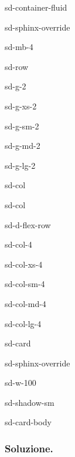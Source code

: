 \documentclass[letterpaper,10pt,italian]{jupyterBook}
\begin{document}
\begin{sphinxuseclass}{sd-container-fluid}
\begin{sphinxuseclass}{sd-sphinx-override}
\begin{sphinxuseclass}{sd-mb-4}
\begin{sphinxuseclass}{sd-row}
\begin{sphinxuseclass}{sd-g-2}
\begin{sphinxuseclass}{sd-g-xs-2}
\begin{sphinxuseclass}{sd-g-sm-2}
\begin{sphinxuseclass}{sd-g-md-2}
\begin{sphinxuseclass}{sd-g-lg-2}
\begin{sphinxuseclass}{sd-col}
\end{sphinxuseclass}
\begin{sphinxuseclass}{sd-col}
\begin{sphinxuseclass}{sd-d-flex-row}
\begin{sphinxuseclass}{sd-col-4}
\begin{sphinxuseclass}{sd-col-xs-4}
\begin{sphinxuseclass}{sd-col-sm-4}
\begin{sphinxuseclass}{sd-col-md-4}
\begin{sphinxuseclass}{sd-col-lg-4}
\begin{sphinxuseclass}{sd-card}
\begin{sphinxuseclass}{sd-sphinx-override}
\begin{sphinxuseclass}{sd-w-100}
\begin{sphinxuseclass}{sd-shadow-sm}
\begin{sphinxuseclass}{sd-card-body}




\end{sphinxuseclass}
\end{sphinxuseclass}
\end{sphinxuseclass}
\end{sphinxuseclass}
\end{sphinxuseclass}
\end{sphinxuseclass}
\end{sphinxuseclass}
\end{sphinxuseclass}
\end{sphinxuseclass}
\end{sphinxuseclass}
\end{sphinxuseclass}
\end{sphinxuseclass}
\end{sphinxuseclass}
\end{sphinxuseclass}
\end{sphinxuseclass}
\end{sphinxuseclass}
\end{sphinxuseclass}
\end{sphinxuseclass}
\end{sphinxuseclass}
\end{sphinxuseclass}
\end{sphinxuseclass}\subsubsection*{Soluzione.}
\end{document}
